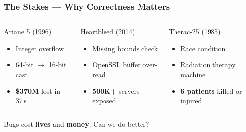 \begin{frame}
\frametitle{The Stakes --- Why Correctness Matters}
\begin{columns}[T]
\begin{alertblock}{Ariane 5 (1996)}
  \begin{itemize}
    \item Integer overflow
    \item 64-bit $\to$ 16-bit cast
    \item \textcolor{jugeoRed}{\textbf{\$370M}} lost in 37\,s
  \end{itemize}
\end{alertblock}
\begin{alertblock}{Heartbleed (2014)}
  \begin{itemize}
    \item Missing bounds check
    \item OpenSSL buffer over-read
    \item \textcolor{jugeoRed}{\textbf{500K+}} servers exposed
  \end{itemize}
\end{alertblock}
\begin{alertblock}{Therac-25 (1985)}
  \begin{itemize}
    \item Race condition
    \item Radiation therapy machine
    \item \textcolor{jugeoRed}{\textbf{6 patients}} killed or injured
  \end{itemize}
\end{alertblock}
\end{columns}
\vfill
\begin{center}
\large Bugs cost \textbf{lives} and \textbf{money}. Can we do better?
\end{center}
\end{frame}

